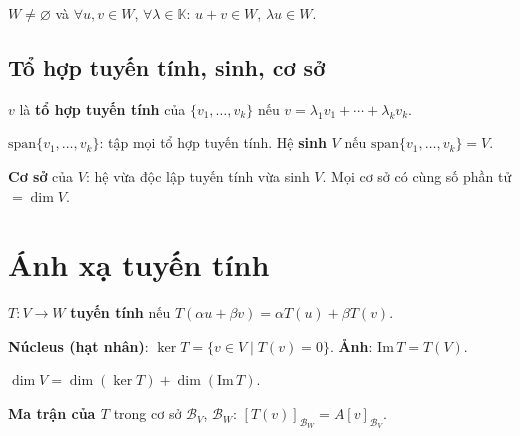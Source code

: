\documentclass[12pt,a4paper]{article}
\begin{document}
\begin{phuongphap}[title={Kiểm tra không gian con}]
  $W \ne \varnothing$ và $\forall u, v \in W$, $\forall \lambda \in \mathbb{K}$: $u + v \in W$, $\lambda u \in W$.
\end{phuongphap}

\subsection{Tổ hợp tuyến tính, sinh, cơ sở}

\begin{dinhnghia}
  $v$ là \textbf{tổ hợp tuyến tính} của $\{v_1, \ldots, v_k\}$ nếu $v = \lambda_1 v_1 + \cdots + \lambda_k v_k$.
\end{dinhnghia}

\begin{dinhnghia}
  $\mathrm{span}\{v_1, \ldots, v_k\}$: tập mọi tổ hợp tuyến tính. Hệ \textbf{sinh} $V$ nếu $\mathrm{span}\{v_1, \ldots, v_k\} = V$.
\end{dinhnghia}

\begin{dinhnghia}
  \textbf{Cơ sở} của $V$: hệ vừa độc lập tuyến tính vừa sinh $V$. Mọi cơ sở có cùng số phần tử $= \dim V$.
\end{dinhnghia}

\section{Ánh xạ tuyến tính}

\begin{dinhnghia}
  $T: V \to W$ \textbf{tuyến tính} nếu $T(\alpha u + \beta v) = \alpha T(u) + \beta T(v)$.
\end{dinhnghia}

\begin{dinhnghia}
  \textbf{Núcleus (hạt nhân)}: $\ker T = \{v \in V \mid T(v) = 0\}$. \textbf{Ảnh}: $\mathrm{Im}\,T = T(V)$.
\end{dinhnghia}

\begin{dinhly}[title={Định lý chiều}]
  $\dim V = \dim(\ker T) + \dim(\mathrm{Im}\,T)$.
\end{dinhly}

\begin{dinhnghia}
  \textbf{Ma trận của $T$} trong cơ sở $\mathcal{B}_V$, $\mathcal{B}_W$: $[T(v)]_{\mathcal{B}_W} = A [v]_{\mathcal{B}_V}$.
\end{dinhnghia}
\end{document}
